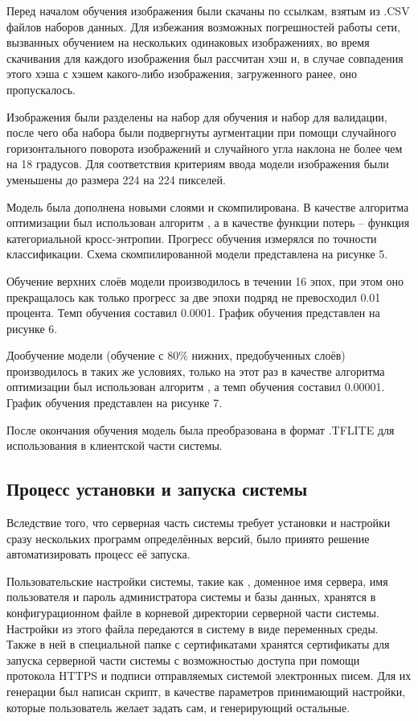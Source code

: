 \tab
Перед началом обучения изображения были скачаны по ссылкам, взятым из .CSV файлов наборов данных.
Для избежания возможных погрешностей работы сети, вызванных обучением на нескольких одинаковых изображениях, во время скачивания для каждого изображения был рассчитан хэш и, в случае совпадения этого хэша с хэшем какого-либо изображения, загруженного ранее, оно пропускалось.

\tab
Изображения были разделены на набор для обучения и набор для валидации, после чего оба набора были подвергнуты аугментации при помощи случайного горизонтального поворота изображений и случайного угла наклона не более чем на 18 градусов.
Для соответствия критериям ввода модели  изображения были уменьшены до размера 224 на 224 пикселей.

\tab
Модель была дополнена новыми слоями и скомпилирована.
В качестве алгоритма оптимизации был использован алгоритм , а в качестве функции потерь -- функция категориальной кросс-энтропии.
Прогресс обучения измерялся по точности классификации.
Схема скомпилированной модели представлена на рисунке 5.
\picturefive

\tab
Обучение верхних слоёв модели производилось в течении 16 эпох, при этом оно прекращалось как только прогресс за две эпохи подряд не превосходил 0.01 процента.
Темп обучения составил 0.0001.
График обучения представлен на рисунке 6.
\picturesix

\tab
Дообучение модели (обучение с 80\%  нижних, предобученных слоёв) производилось в таких же условиях, только на этот раз в качестве алгоритма оптимизации был использован алгоритм , а темп обучения составил 0.00001.
График обучения представлен на рисунке 7.
\pictureseven

\tab
После окончания обучения модель была преобразована в формат .TFLITE для использования в клиентской части системы.

\subsection{Процесс установки и запуска системы}
\label{subsec:installing-and-launching}

\tab
Вследствие того, что серверная часть системы требует установки и настройки сразу нескольких программ определённых версий, было принято решение автоматизировать процесс её запуска.

\tab
Пользовательские настройки системы, такие как , доменное имя сервера, имя пользователя и пароль администратора системы и базы данных, хранятся в конфигурационном файле в корневой директории серверной части системы.
Настройки из этого файла передаются в систему в виде переменных среды.
Также в ней в специальной папке с сертификатами хранятся сертификаты для запуска серверной части системы с возможностью доступа при помощи протокола HTTPS и подписи отправляемых системой электронных писем.
Для их генерации был написан скрипт, в качестве параметров принимающий настройки, которые пользователь желает задать сам, и генерирующий остальные.

